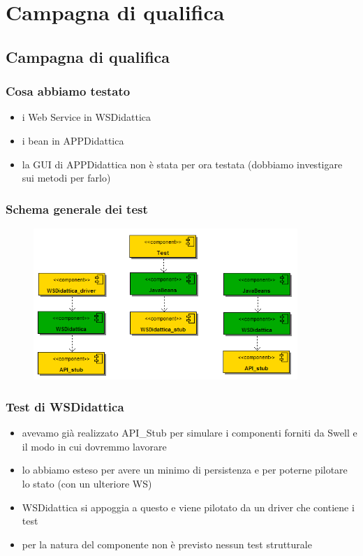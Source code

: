 \section{Campagna di qualifica}

\subsection*{Campagna di qualifica}

\begin{frame}
\frametitle{Cosa abbiamo testato}

\begin{itemize}
	\item i Web Service in WSDidattica
	\item i bean in APPDidattica
	\item la GUI di APPDidattica non è stata per ora testata (dobbiamo investigare sui metodi per farlo)
\end{itemize}
\end{frame}

\begin{frame}
\frametitle{Schema generale dei test}

\begin{figure}
  \includegraphics[width=10cm]{img/SchemaGeneraleTest.png}
\end{figure}

\end{frame}

\begin{frame}
\frametitle{Test di WSDidattica}
\begin{itemize}
\item avevamo già realizzato API\_Stub per simulare i componenti forniti da Swell e il modo in cui dovremmo lavorare
\item lo abbiamo esteso per avere un minimo di persistenza e per poterne pilotare lo stato (con un ulteriore WS)
\item WSDidattica si appoggia a questo e viene pilotato da un driver che contiene i test
\item per la natura del componente non è previsto nessun test strutturale
\end{itemize}

\end{frame}

